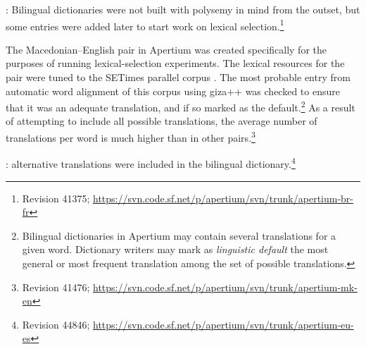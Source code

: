 \documentclass[11pt]{article}
\newcommand{\comment}[1]{\todo{#1}}
\begin{document}
\begin{description}
\addtolength{\itemsep}{-1ex}
\item[Breton--French]  \citep{tyers10b}: Bilingual
  dictionaries were not built with polysemy in mind from the outset,
  but some entries were added later to start work on lexical
  selection.\footnote{Revision
  41375; \url{https://svn.code.sf.net/p/apertium/svn/trunk/apertium-br-fr}}
\item[Macedonian--English:] The Macedonian--English pair
  in Apertium was created specifically for the purposes of running
  lexical-selection experiments. 
  The lexical resources for the pair were tuned to the SETimes
  parallel corpus \citep{tyers10}.
  The most probable entry from automatic word alignment of this corpus
  using {\sc giza++} \citep{och03a} was checked to ensure that it was
  an adequate translation, and if so marked as the
  default.\footnote{Bilingual dictionaries in Apertium
    \citep{forcada2011apertium} may contain several translations for a
    given word. Dictionary writers may mark as \emph{linguistic default} the most
    general or most frequent translation among the set of possible
    translations.} As a result of attempting to include all possible
  translations, the average number of translations per word is much
  higher %
  than in other pairs.\footnote{Revision 41476;
    \url{https://svn.code.sf.net/p/apertium/svn/trunk/apertium-mk-en}}
\item[Basque--Spanish]  \citep{ginesti09}:
  alternative translations were included in the bilingual
  dictionary.\footnote{Revision 44846; \url{https://svn.code.sf.net/p/apertium/svn/trunk/apertium-eu-es}}


\end{description}
\end{document}
